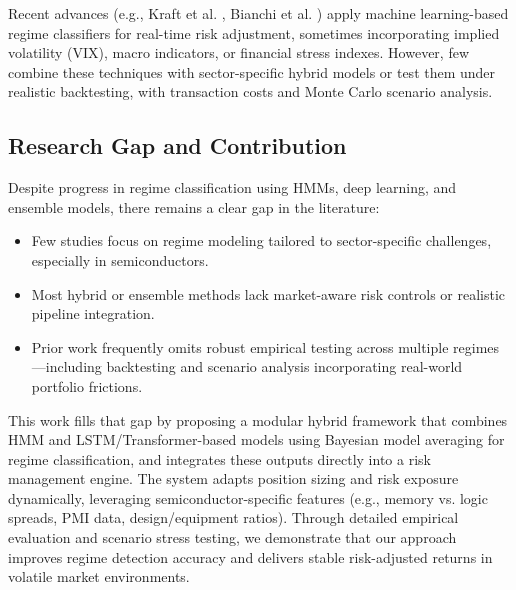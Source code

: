 Recent advances (e.g., Kraft et al. \cite{kraft2020machine}, Bianchi et al. \cite{bianchi2022machine}) apply machine learning-based regime classifiers for real-time risk adjustment, sometimes incorporating implied volatility (VIX), macro indicators, or financial stress indexes. However, few combine these techniques with sector-specific hybrid models or test them under realistic backtesting, with transaction costs and Monte Carlo scenario analysis.

\subsection{Research Gap and Contribution}
Despite progress in regime classification using HMMs, deep learning, and ensemble models, there remains a clear gap in the literature:

\begin{itemize}
    \item Few studies focus on regime modeling tailored to sector-specific challenges, especially in semiconductors.
    \item Most hybrid or ensemble methods lack market-aware risk controls or realistic pipeline integration.
    \item Prior work frequently omits robust empirical testing across multiple regimes—including backtesting and scenario analysis incorporating real-world portfolio frictions.
\end{itemize}

This work fills that gap by proposing a modular hybrid framework that combines HMM and LSTM/Transformer-based models using Bayesian model averaging for regime classification, and integrates these outputs directly into a risk management engine. The system adapts position sizing and risk exposure dynamically, leveraging semiconductor-specific features (e.g., memory vs. logic spreads, PMI data, design/equipment ratios). Through detailed empirical evaluation and scenario stress testing, we demonstrate that our approach improves regime detection accuracy and delivers stable risk-adjusted returns in volatile market environments.